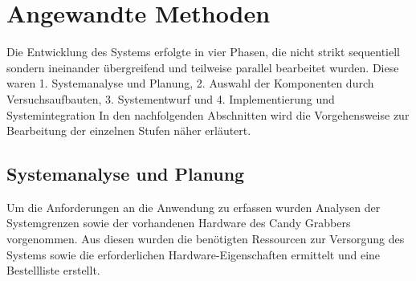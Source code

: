 \documentclass[BMR,Bachelor,ngerman]{twbook}%
\begin{document}
%
\clearpage
\chapter{Angewandte Methoden}
Die Entwicklung des Systems erfolgte in vier Phasen, die nicht strikt sequentiell sondern ineinander übergreifend und teilweise parallel bearbeitet wurden. Diese waren 1. Systemanalyse und Planung, 2. Auswahl der Komponenten durch Versuchsaufbauten, 3. Systementwurf und 4. Implementierung und Systemintegration
In den nachfolgenden Abschnitten wird die Vorgehensweise zur Bearbeitung der einzelnen Stufen näher erläutert.
%
\section{Systemanalyse und Planung}
Um die Anforderungen an die Anwendung zu erfassen wurden Analysen der Systemgrenzen sowie der vorhandenen Hardware des Candy Grabbers vorgenommen. Aus diesen wurden die benötigten Ressourcen zur Versorgung des Systems sowie die erforderlichen Hardware-Eigenschaften ermittelt und eine Bestellliste erstellt. %

\end{document}
